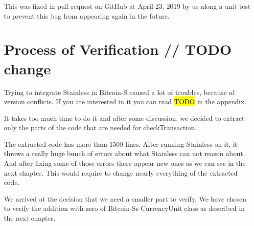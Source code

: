 This was fixed in pull request  on GitHub at April 23, 2019 by us along a unit test to prevent this bug from appearing again in the future.


\section{Process of Verification // TODO change}

Trying to integrate Stainless in Bitcoin-S caused a lot of troubles, because of version conflicts.
If you are interested in it you can read \hl{TODO} in the appendix.

It takes too much time to do it and after some discussion, we decided to extract only the parts of the code that are needed for checkTransaction.

The extracted code has more than 1500 lines.
After running Stainless on it, it throws a really huge bunch of errors about what Stainless can not reason about.
And after fixing some of those errors there appear new ones as we can see in the next chapter.
This would require to change nearly everything of the extracted code.

We arrived at the decision that we need a smaller part to verify.
We have chosen to verify the addition with zero of Bitcoin-Ss CurrencyUnit class as described in the next chapter.

